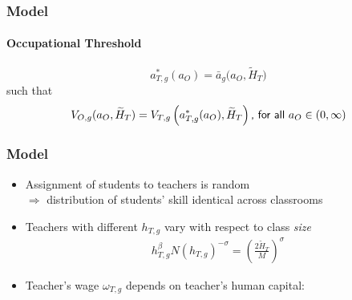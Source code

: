 \documentclass[11pt]{beamer}
\begin{document}
	\begin{frame}
		\frametitle{Model}
		\framesubtitle{Occupational Threshold}
		\begin{equation*}
			a^*_{T,g}(a_O) = \bar{a}_g\big(a_{O},\widetilde{H}_T\big) %
		\end{equation*}
		such that
		\begin{equation}
			\label{eq:indiff}
			V_{O,g}(a_{O},\widetilde{H}_T) = V_{T,g}\left(a^*_{T,g}(a_O),\widetilde{H}_T\right) \textrm{{\sf , for all} } a_O \in (0,\infty) \nonumber
		\end{equation}
	\end{frame}
	
	\begin{frame}
		\frametitle{Model}
			\begin{itemize}
				\item Assignment of students to teachers is random \\ $\Rightarrow$ distribution of students' skill identical across classrooms
				\item Teachers with different $h_{T,g}$ vary with respect to class {\it size}
				\begin{align*}
					h_{T,g}^\beta N(h_{T,g})^{-\sigma} =\left(\frac{2\widetilde{H}_T}{M}\right)^\sigma
				\end{align*}
				\item Teacher's wage $\omega_{T,g}$ depends on teacher's human capital:
				\begin{align*}

\end{align*}
\end{itemize}
\end{frame}
\end{document}
